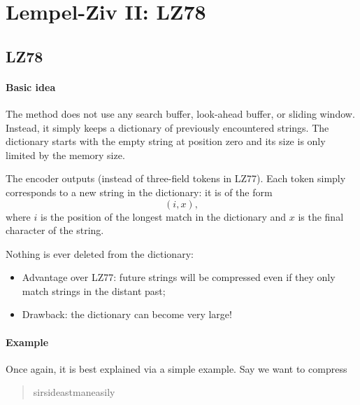 \section{Lempel-Ziv II: LZ78}
\label{sec:04}


\subsection{LZ78}

\paragraph{Basic idea} The  method does not use any search buffer, look-ahead buffer, or sliding window. Instead, it simply keeps a dictionary of previously encountered strings. The dictionary starts with the empty string at position zero and its size is only limited by the memory size.

The encoder outputs  (instead of three-field tokens in LZ77). Each token simply corresponds to a new string in the dictionary: it is of the form
\[
    (i, x),
\]
where $i$ is the position of the longest match in the dictionary and $x$ is the final character of the string.

Nothing is ever deleted from the dictionary:
\begin{itemize}
    \item Advantage over LZ77: future strings will be compressed even if they only match strings in the distant past;
    
    \item Drawback: the dictionary can become very large!
\end{itemize}

\paragraph{Example} Once again, it is best explained via a simple example. Say we want to compress
\begin{quote}
    sir\textvisiblespace sid\textvisiblespace eastman\textvisiblespace easily%
\end{quote}

